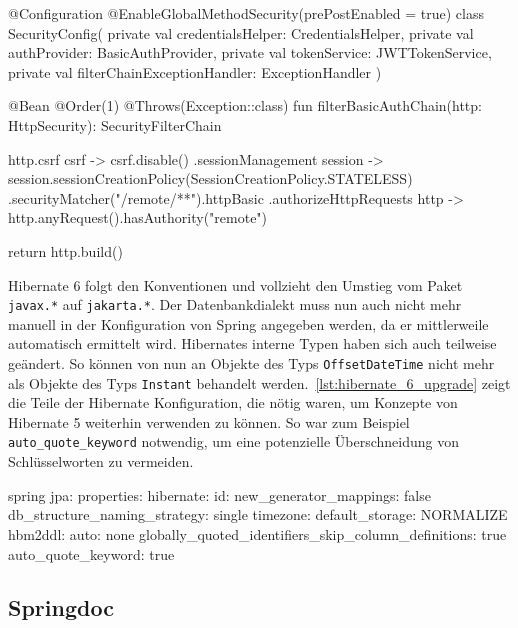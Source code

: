 \begin{JavaCode}[numbers=none, caption={Eine der \texttt{SecurityFilterChain}-Einträge unter Spring Boot 3}, label={lst:spring_security}]
@Configuration
@EnableGlobalMethodSecurity(prePostEnabled = true)
class SecurityConfig(
    private val credentialsHelper: CredentialsHelper,
    private val authProvider: BasicAuthProvider,
    private val tokenService: JWTTokenService,
    private val filterChainExceptionHandler: ExceptionHandler
) {
    @Bean
    @Order(1)
    @Throws(Exception::class)
    fun filterBasicAuthChain(http: HttpSecurity): SecurityFilterChain {
        http.csrf { csrf ->
            csrf.disable()
                .sessionManagement { session ->
                    session.sessionCreationPolicy(SessionCreationPolicy.STATELESS)
                }
                .securityMatcher("/remote/**").httpBasic {}
                .authorizeHttpRequests { http ->
                    http.anyRequest().hasAuthority("remote")
                }
        }

        return http.build()
    }
}
\end{JavaCode}

Hibernate 6 folgt den Konventionen und vollzieht den Umstieg vom Paket \texttt{javax.*} auf \texttt{jakarta.*}. Der Datenbankdialekt muss nun auch nicht mehr manuell in der Konfiguration von Spring angegeben werden, da er mittlerweile automatisch ermittelt wird. Hibernates interne Typen haben sich auch teilweise geändert. So können von nun an Objekte des Typs \texttt{OffsetDateTime} nicht mehr als Objekte des Typs \texttt{Instant} behandelt werden.~\autoref{lst:hibernate_6_upgrade} zeigt die Teile der Hibernate Konfiguration, die nötig waren, um Konzepte von Hibernate 5 weiterhin verwenden zu können. So war zum Beispiel \texttt{auto\_quote\_keyword} notwendig, um eine potenzielle Überschneidung von Schlüsselworten zu vermeiden.

\begin{JavaCode}[numbers=none, caption={Neu hinzu gekommene Hibernate Konfiguration für die Aktualisierung auf Version 6}, label={lst:hibernate_6_upgrade}]
spring
  jpa:
    properties:
    hibernate:
      id:
        new_generator_mappings: false
        db_structure_naming_strategy: single
      timezone:
        default_storage: NORMALIZE
      hbm2ddl:
        auto: none
      globally_quoted_identifiers_skip_column_definitions: true
      auto_quote_keyword: true
\end{JavaCode}

\subsection{Springdoc}

